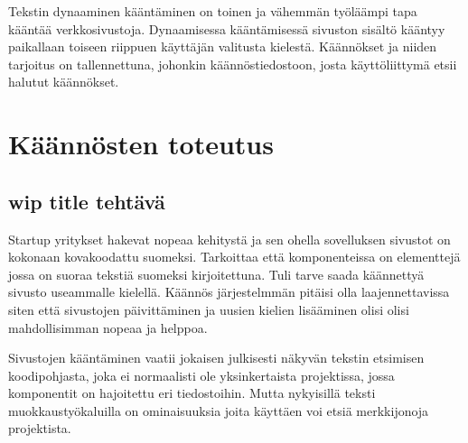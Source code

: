 \documentclass[11pt,a4paper,titlepage,oneside]{article}
\begin{document}

Tekstin dynaaminen kääntäminen on toinen ja vähemmän työläämpi tapa kääntää verkkosivustoja.
Dynaamisessa kääntämisessä sivuston sisältö kääntyy paikallaan toiseen riippuen käyttäjän valitusta kielestä.
Käännökset ja niiden tarjoitus on tallennettuna, johonkin käännöstiedostoon, 
josta käyttöliittymä etsii halutut käännökset.\citemissing
\medskip

































\newpage






\section{Käännösten toteutus}

\subsection{wip title tehtävä}


Startup yritykset hakevat nopeaa kehitystä ja sen ohella sovelluksen sivustot on kokonaan kovakoodattu suomeksi.
Tarkoittaa että komponenteissa on elementtejä jossa on suoraa tekstiä suomeksi kirjoitettuna.
Tuli tarve saada käännettyä sivusto useammalle kielellä.
Käännös järjestelmmän pitäisi olla laajennettavissa siten että sivustojen päivittäminen ja uusien kielien lisääminen olisi 
olisi mahdollisimman nopeaa ja helppoa.

\medskip


Sivustojen kääntäminen vaatii jokaisen julkisesti näkyvän tekstin etsimisen koodipohjasta, 
joka ei normaalisti ole yksinkertaista projektissa, jossa komponentit on hajoitettu eri tiedostoihin.
Mutta nykyisillä teksti muokkaustyökaluilla on ominaisuuksia joita käyttäen voi etsiä merkkijonoja projektista.
\end{document}
